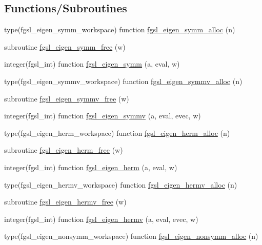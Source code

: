 \subsection*{Functions/\+Subroutines}
\begin{DoxyCompactItemize}
\item 
type(fgsl\+\_\+eigen\+\_\+symm\+\_\+workspace) function \hyperlink{eigen_8finc_a4911814478ea47e01623311df0dfe1b7}{fgsl\+\_\+eigen\+\_\+symm\+\_\+alloc} (n)
\item 
subroutine \hyperlink{eigen_8finc_a9127a0929117934b84723c05fe120916}{fgsl\+\_\+eigen\+\_\+symm\+\_\+free} (w)
\item 
integer(fgsl\+\_\+int) function \hyperlink{eigen_8finc_a5a37dd1d463478768f432232bf994e43}{fgsl\+\_\+eigen\+\_\+symm} (a, eval, w)
\item 
type(fgsl\+\_\+eigen\+\_\+symmv\+\_\+workspace) function \hyperlink{eigen_8finc_ad1fec4036528852c97539008a009c875}{fgsl\+\_\+eigen\+\_\+symmv\+\_\+alloc} (n)
\item 
subroutine \hyperlink{eigen_8finc_a3f312c4069b7de24f2a7b9112bd11fab}{fgsl\+\_\+eigen\+\_\+symmv\+\_\+free} (w)
\item 
integer(fgsl\+\_\+int) function \hyperlink{eigen_8finc_a42022987fd3e17b60db77ce044515bc1}{fgsl\+\_\+eigen\+\_\+symmv} (a, eval, evec, w)
\item 
type(fgsl\+\_\+eigen\+\_\+herm\+\_\+workspace) function \hyperlink{eigen_8finc_a6a713bfd56b0df2694ba508eb70ea7b0}{fgsl\+\_\+eigen\+\_\+herm\+\_\+alloc} (n)
\item 
subroutine \hyperlink{eigen_8finc_ab28944c18e254129ddf3289f7b8d8bc4}{fgsl\+\_\+eigen\+\_\+herm\+\_\+free} (w)
\item 
integer(fgsl\+\_\+int) function \hyperlink{eigen_8finc_ad73920fff8c0f5043f47fbf2930280cb}{fgsl\+\_\+eigen\+\_\+herm} (a, eval, w)
\item 
type(fgsl\+\_\+eigen\+\_\+hermv\+\_\+workspace) function \hyperlink{eigen_8finc_af23f2bdc295d9082a0cd3d383788199a}{fgsl\+\_\+eigen\+\_\+hermv\+\_\+alloc} (n)
\item 
subroutine \hyperlink{eigen_8finc_a6a876223b366e9e91962c7106148929c}{fgsl\+\_\+eigen\+\_\+hermv\+\_\+free} (w)
\item 
integer(fgsl\+\_\+int) function \hyperlink{eigen_8finc_ab9e8f1e044d459595f880d4c380f537f}{fgsl\+\_\+eigen\+\_\+hermv} (a, eval, evec, w)
\item 
type(fgsl\+\_\+eigen\+\_\+nonsymm\+\_\+workspace) function \hyperlink{eigen_8finc_a67e1213526c2a57e599ea68c4ccb7f17}{fgsl\+\_\+eigen\+\_\+nonsymm\+\_\+alloc} (n)

\end{DoxyCompactItemize}
